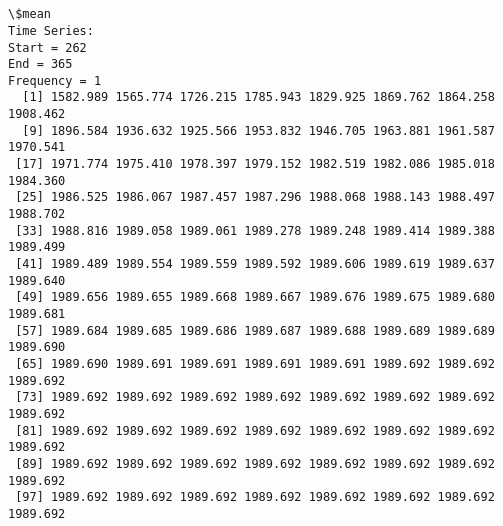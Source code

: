 \documentclass[11pt]{article}
\begin{document}
    \begin{center}
    \end{center}
    { \hspace*{\fill} \\}
    
    \begin{center}
    \end{center}
    { \hspace*{\fill} \\}
    
    \begin{Verbatim}[commandchars=\\\{\}]
\$mean
Time Series:
Start = 262 
End = 365 
Frequency = 1 
  [1] 1582.989 1565.774 1726.215 1785.943 1829.925 1869.762 1864.258 1908.462
  [9] 1896.584 1936.632 1925.566 1953.832 1946.705 1963.881 1961.587 1970.541
 [17] 1971.774 1975.410 1978.397 1979.152 1982.519 1982.086 1985.018 1984.360
 [25] 1986.525 1986.067 1987.457 1987.296 1988.068 1988.143 1988.497 1988.702
 [33] 1988.816 1989.058 1989.061 1989.278 1989.248 1989.414 1989.388 1989.499
 [41] 1989.489 1989.554 1989.559 1989.592 1989.606 1989.619 1989.637 1989.640
 [49] 1989.656 1989.655 1989.668 1989.667 1989.676 1989.675 1989.680 1989.681
 [57] 1989.684 1989.685 1989.686 1989.687 1989.688 1989.689 1989.689 1989.690
 [65] 1989.690 1989.691 1989.691 1989.691 1989.691 1989.692 1989.692 1989.692
 [73] 1989.692 1989.692 1989.692 1989.692 1989.692 1989.692 1989.692 1989.692
 [81] 1989.692 1989.692 1989.692 1989.692 1989.692 1989.692 1989.692 1989.692
 [89] 1989.692 1989.692 1989.692 1989.692 1989.692 1989.692 1989.692 1989.692
 [97] 1989.692 1989.692 1989.692 1989.692 1989.692 1989.692 1989.692 1989.692


\end{Verbatim}
\end{document}
